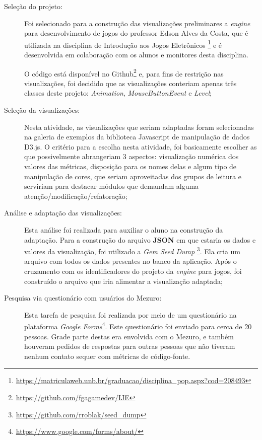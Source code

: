 \begin{description}
  \item [Seleção do projeto:]
    Foi selecionado para a construção das visualizações preliminares a
    \textit{engine} para desenvolvimento de jogos do professor Edson Alves da
    Costa, que é utilizada na disciplina de Introdução aos Jogos Eletrônicos
    \footnote{\url{https://matriculaweb.unb.br/graduacao/disciplina_pop.aspx?cod=208493}}
     e é desenvolvida em colaboração com os alunos e monitores desta disciplina.

     O código está disponível no Github\footnote{\url{https://github.com/fgagamedev/IJE}}
     e, para fins de restrição nas visualizações, foi decidido que as
     visualizações conteriam apenas três classes deste projeto: \textit{Animation},
     \textit{MouseButtonEvent} e \textit{Level};

  \item [Seleção da visualizações:]
    Nesta atividade, as visualizações que seriam adaptadas foram selecionadas na
    galeria de exemplos da biblioteca Javascript de manipulação de dados D3.js.
    O critério para a escolha nesta atividade, foi basicamente escolher as que
    possivelmente abrangeriam 3 aspectos: visualização numérica dos valores das
    métricas, disposição para os nomes delas e algum tipo de manipulação de
    cores, que seriam aproveitadas dos grupos de leitura e serviriam para
    destacar módulos que demandam alguma atenção/modificação/refatoração;

  \item [Análise e adaptação das visualizações:]
    Esta análise foi realizada para auxiliar o aluno na construção da adaptação.
    Para a construção do arquivo \textbf{JSON} em que estaria os dados e valores
    da visualização, foi utilizado a \textit{Gem Seed Dump}
    \footnote{\url{https://github.com/rroblak/seed_dump}}. Ela cria um arquivo
    com todos os dados presentes no banco da aplicação. Após o cruzamento com
    os identificadores do projeto da \textit{engine} para jogos, foi construído
    o arquivo que iria alimentar a visualização adaptada;

  \item [Pesquisa via questionário com usuários do Mezuro:]
    Esta tarefa de pesquisa foi realizada por meio de um questionário na
    plataforma \textit{Google Forms}\footnote{\url{https://www.google.com/forms/about/}}.
    Este questionário foi enviado para cerca de 20 pessoas. Grade parte destas
    era envolvida com o Mezuro, e também houveram pedidos de respostas para
    outras pessoas que não tiveram nenhum contato sequer com métricas de
    código-fonte.


\end{description}
